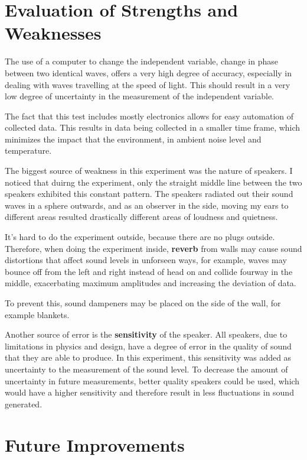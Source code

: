 \documentclass[index]{subfiles}
\begin{document}
\section{Evaluation of Strengths and Weaknesses}
The use of a computer to change the independent variable, change in phase between two identical waves, offers a very high degree of accuracy, especially in dealing with waves travelling at the speed of light. This should result in a very low degree of uncertainty in the measurement of the independent variable.

The fact that this test includes mostly electronics allows for easy automation of collected data. This results in data being collected in a smaller time frame, which minimizes the impact that the environment, in ambient noise level and temperature.

The biggest source of weakness in this experiment was the nature of speakers. I noticed that duirng the experiment, only the straight middle line between the two speakers exhibited this constant pattern. The speakers radiated out their sound waves in a sphere outwards, and as an observer in the side, moving my ears to different areas resulted drastically different areas of loudness and quietness.

It's hard to do the experiment outside, because there are no plugs outside. Therefore, when doing the experiment inside, \textbf{reverb} from walls may cause sound distortions that affect sound levels in unforseen ways, for example, waves may bounce off from the left and right instead of head on and collide fourway in the middle, exacerbating maximum amplitudes and increasing the deviation of data.

To prevent this, sound dampeners may be placed on the side of the wall, for example blankets.

Another source of error is the \textbf{sensitivity} of the speaker. All speakers, due to limitations in physics and design, have a degree of error in the quality of sound that they are able to produce. In this experiment, this sensitivity was added as uncertainty to the measurement of the sound level. To decrease the amount of uncertainty in future measurements, better quality speakers could be used, which would have a higher sensitivity and therefore result in less fluctuations in sound generated.

\section{Future Improvements}
\end{document}
